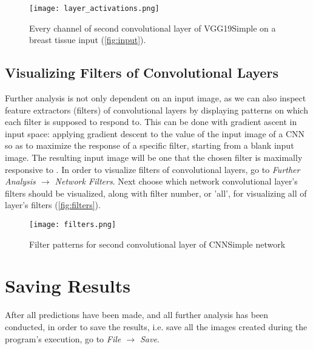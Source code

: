 \begin{figure}[h]
	\centering
	\texttt{[image: layer\_activations.png]}
	\caption{Every channel of second convolutional layer of VGG19Simple on a breast tissue input (\textcolor{red}{\autoref{fig:input}}).}
	\label{fig:interact}
\end{figure}

\subsection{Visualizing Filters of Convolutional Layers}

Further analysis is not only dependent on an input image, as we can also inspect feature extractors (filters) of convolutional layers by displaying patterns on which each filter is supposed to respond to. This can be done with gradient ascent in input space: applying gradient descent to the value of the input image of a CNN so as to maximize the response of a specific filter, starting from a blank input image. The resulting input image will be one that the chosen filter is maximally responsive to \cite{chollet2018deep}. In order to visualize filters of convolutional layers, go to \emph{Further Analysis $\rightarrow$ Network Filters}.  Next choose which network convolutional layer's filters should be visualized, along with filter number, or 'all', for visualizing all of layer's filters  (\textcolor{red}{\autoref{fig:filters}}).

\begin{figure}[h]
	\centering
	\texttt{[image: filters.png]}
	\caption{Filter patterns for second convolutional layer of CNNSimple network}
	\label{fig:filters}
\end{figure}

\section{Saving Results}
After all predictions have been made, and all further analysis has been conducted, in order to save the results, i.e. save all the images created during the program's execution, go to \emph{File $\rightarrow$ Save}.
